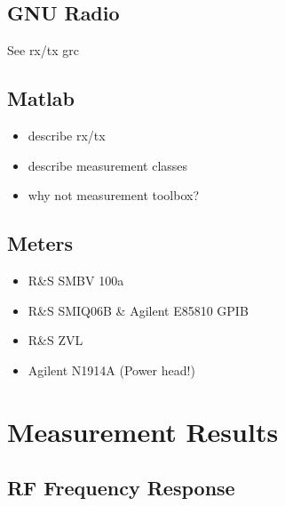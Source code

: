 \documentclass[12pt,a4paper,parskip=full]{scrreprt}
\begin{document}
\section{GNU Radio}
See rx/tx grc
\section{Matlab}
\begin{itemize}
    \item describe rx/tx
    \item describe measurement classes
    \item why not measurement toolbox?
\end{itemize}
\section{Meters}
\begin{itemize}
    \item R\&S SMBV 100a
    \item R\&S SMIQ06B \& Agilent E85810 GPIB
    \item R\&S ZVL
    \item Agilent N1914A (Power head!)
\end{itemize}
\chapter{Measurement Results}
\section{RF Frequency Response}
\end{document}
